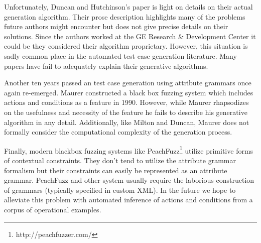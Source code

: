 Unfortunately, Duncan and Hutchinson's paper is light on details on their actual
generation algorithm. Their prose description highlights many of the problems
future authors might encounter but does not give precise details on their
solutions. Since the authors worked at the GE Research \& Development Center it
could be they considered their algorithm proprietary. However, this situation is
sadly common place in the automated test case generation literature. Many papers
have fail to adequately explain their generative algorithms. 

Another ten years passed an test case generation using attribute grammars once
again re-emerged. Maurer constructed a black box fuzzing system which includes
actions and conditions as a feature in 1990.\cite{Maurer1990} However, while
Maurer rhapsodizes on the usefulness and necessity of the feature he fails to
describe his generative algorithm in any detail. Additionally, like Milton and
Duncan, Maurer does not formally consider the computational complexity of the
generation process.

Finally, modern blackbox fuzzing systems like
PeachFuzz\footnote{http://peachfuzzer.com/} utilize primitive forms of
contextual constraints. They don't tend to utilize the attribute grammar
formalism but their constraints can easily be represented as an attribute
grammar. PeachFuzz and other system usually require the laborious construction
of grammars (typically specified in custom XML). In the future we hope to
alleviate this problem with automated inference of actions and conditions from a
corpus of operational examples.

